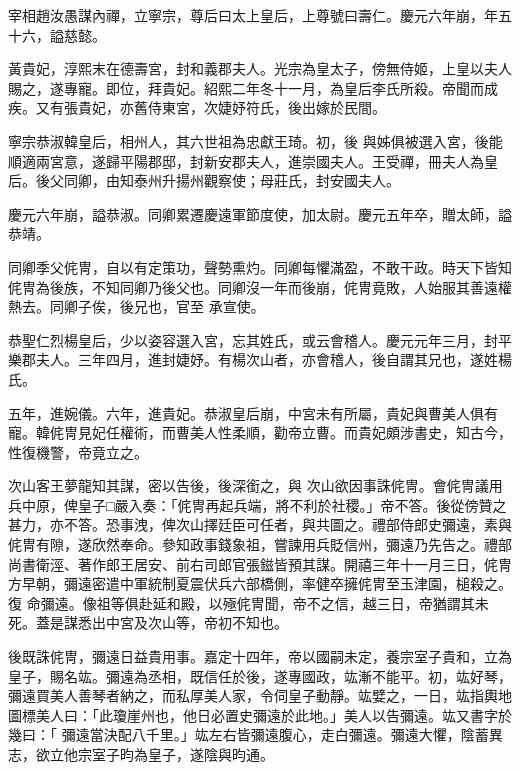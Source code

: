 \begin{pinyinscope}
 宰相趙汝愚謀內禪，立寧宗，尊后曰太上皇后，上尊號曰壽仁。慶元六年崩，年五十六，謚慈懿。



 黃貴妃，淳熙末在德壽宮，封和義郡夫人。光宗為皇太子，傍無侍姬，上皇以夫人賜之，遂專寵。即位，拜貴妃。紹熙二年冬十一月，為皇后李氏所殺。帝聞而成疾。又有張貴妃，亦舊侍東宮，次婕妤符氏，後出嫁於民間。



 寧宗恭淑韓皇后，相州人，其六世祖為忠獻王琦。初，後
 與姊俱被選入宮，後能順適兩宮意，遂歸平陽郡邸，封新安郡夫人，進崇國夫人。王受禪，冊夫人為皇后。後父同卿，由知泰州升揚州觀察使；母莊氏，封安國夫人。



 慶元六年崩，謚恭淑。同卿累遷慶遠軍節度使，加太尉。慶元五年卒，贈太師，謚恭靖。



 同卿季父侂冑，自以有定策功，聲勢熏灼。同卿每懼滿盈，不敢干政。時天下皆知侂冑為後族，不知同卿乃後父也。同卿沒一年而後崩，侂冑竟敗，人始服其善遠權熱去。同卿子俟，後兄也，官至
 承宣使。



 恭聖仁烈楊皇后，少以姿容選入宮，忘其姓氏，或云會稽人。慶元元年三月，封平樂郡夫人。三年四月，進封婕妤。有楊次山者，亦會稽人，後自謂其兄也，遂姓楊氏。



 五年，進婉儀。六年，進貴妃。恭淑皇后崩，中宮未有所屬，貴妃與曹美人俱有寵。韓侂冑見妃任權術，而曹美人性柔順，勸帝立曹。而貴妃頗涉書史，知古今，性復機警，帝竟立之。



 次山客王夢龍知其謀，密以告後，後深銜之，與
 次山欲因事誅侂冑。會侂冑議用兵中原，俾皇子□嚴入奏：「侂冑再起兵端，將不利於社稷。」帝不答。後從傍贊之甚力，亦不答。恐事洩，俾次山擇廷臣可任者，與共圖之。禮部侍郎史彌遠，素與侂冑有隙，遂欣然奉命。參知政事錢象祖，嘗諫用兵貶信州，彌遠乃先告之。禮部尚書衛涇、著作郎王居安、前右司郎官張鎡皆預其謀。開禧三年十一月三日，侂冑方早朝，彌遠密遣中軍統制夏震伏兵六部橋側，率健卒擁侂冑至玉津園，槌殺之。復
 命彌遠。像祖等俱赴延和殿，以殛侂冑聞，帝不之信，越三日，帝猶謂其未死。蓋是謀悉出中宮及次山等，帝初不知也。



 後既誅侂冑，彌遠日益貴用事。嘉定十四年，帝以國嗣未定，養宗室子貴和，立為皇子，賜名竑。彌遠為丞相，既信任於後，遂專國政，竑漸不能平。初，竑好琴，彌遠買美人善琴者納之，而私厚美人家，令伺皇子動靜。竑嬖之，一日，竑指輿地圖標美人曰：「此瓊崖州也，他日必置史彌遠於此地。」美人以告彌遠。竑又書字於幾曰：「
 彌遠當決配八千里。」竑左右皆彌遠腹心，走白彌遠。彌遠大懼，陰蓄異志，欲立他宗室子昀為皇子，遂陰與昀通。




\end{pinyinscope}
